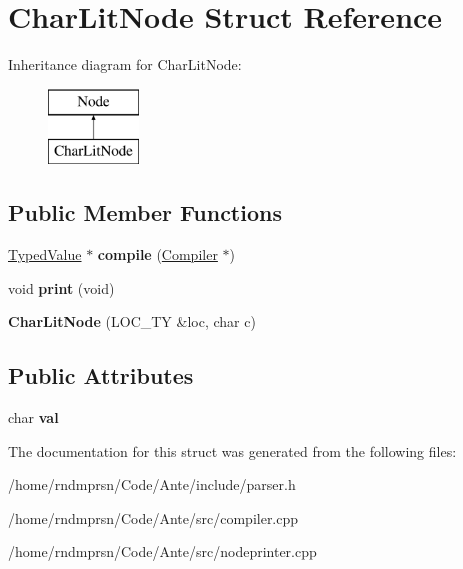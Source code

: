 \hypertarget{structCharLitNode}{}\section{Char\+Lit\+Node Struct Reference}
\label{structCharLitNode}
Inheritance diagram for Char\+Lit\+Node\+:\begin{figure}[H]
\begin{center}
\leavevmode
\includegraphics[height=2.000000cm]{structCharLitNode}
\end{center}
\end{figure}
\subsection*{Public Member Functions}
\begin{DoxyCompactItemize}
\item 
\mbox{\label{structCharLitNode_a87adac620278ad254e978d3b79e02d8d}} 
\hyperlink{structTypedValue}{Typed\+Value} $\ast$ {\bfseries compile} (\hyperlink{structante_1_1Compiler}{Compiler} $\ast$)
\item 
\mbox{\label{structCharLitNode_a04c386eff021ab495fddd9aafe259fcf}} 
void {\bfseries print} (void)
\item 
\mbox{\label{structCharLitNode_a6aa60ec685100797c25ac11033b9d42a}} 
{\bfseries Char\+Lit\+Node} (L\+O\+C\+\_\+\+TY \&loc, char c)
\end{DoxyCompactItemize}
\subsection*{Public Attributes}
\begin{DoxyCompactItemize}
\item 
\mbox{\label{structCharLitNode_a088ba87702498c1f658143a591ff9883}} 
char {\bfseries val}
\end{DoxyCompactItemize}


The documentation for this struct was generated from the following files\+:\begin{DoxyCompactItemize}
\item 
/home/rndmprsn/\+Code/\+Ante/include/parser.\+h\item 
/home/rndmprsn/\+Code/\+Ante/src/compiler.\+cpp\item 
/home/rndmprsn/\+Code/\+Ante/src/nodeprinter.\+cpp\end{DoxyCompactItemize}
